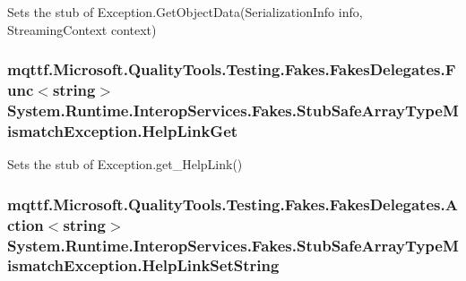 Sets the stub of Exception.\-Get\-Object\-Data(\-Serialization\-Info info, Streaming\-Context context)

\hypertarget{class_system_1_1_runtime_1_1_interop_services_1_1_fakes_1_1_stub_safe_array_type_mismatch_exception_aaea2e1419b397de76510b81e23690fc8}{
\subsubsection[{Help\-Link\-Get}]{\setlength{\rightskip}{0pt plus 5cm}mqttf.\-Microsoft.\-Quality\-Tools.\-Testing.\-Fakes.\-Fakes\-Delegates.\-Func$<$string$>$ System.\-Runtime.\-Interop\-Services.\-Fakes.\-Stub\-Safe\-Array\-Type\-Mismatch\-Exception.\-Help\-Link\-Get}}\label{class_system_1_1_runtime_1_1_interop_services_1_1_fakes_1_1_stub_safe_array_type_mismatch_exception_aaea2e1419b397de76510b81e23690fc8}


Sets the stub of Exception.\-get\-\_\-\-Help\-Link()

\hypertarget{class_system_1_1_runtime_1_1_interop_services_1_1_fakes_1_1_stub_safe_array_type_mismatch_exception_a7d7b9ddeade45c485048f2e34536a720}{
\subsubsection[{Help\-Link\-Set\-String}]{\setlength{\rightskip}{0pt plus 5cm}mqttf.\-Microsoft.\-Quality\-Tools.\-Testing.\-Fakes.\-Fakes\-Delegates.\-Action$<$string$>$ System.\-Runtime.\-Interop\-Services.\-Fakes.\-Stub\-Safe\-Array\-Type\-Mismatch\-Exception.\-Help\-Link\-Set\-String}}\label{class_system_1_1_runtime_1_1_interop_services_1_1_fakes_1_1_stub_safe_array_type_mismatch_exception_a7d7b9ddeade45c485048f2e34536a720}


